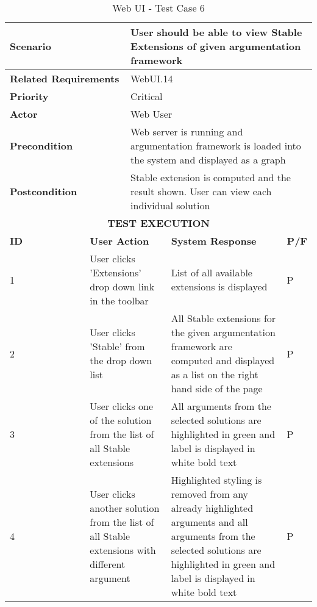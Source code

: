 \begin{longtable}[c]{p{}|p{}|p{}|p{}|p{}}
	\caption{Web UI - Test Case 6}
	\label{table:testcase6} \\
	\hline
	\multicolumn{2}{p{0.3\textwidth}}{\textbf{Scenario}} & \multicolumn{3}{p{0.6\textwidth}}{User should be able to view Stable Extensions of given argumentation framework} \\ 
	\hline
	\endfirsthead
	\endhead
	\multicolumn{2}{p{0.3\textwidth}}{\textbf{Related Requirements}} & \multicolumn{3}{p{0.6\textwidth}}{WebUI.14} \\ 
	\hline
	\multicolumn{2}{p{0.3\textwidth}}{\textbf{Priority}} & \multicolumn{3}{p{0.6\textwidth}}{Critical} \\ 
	\hline
	\multicolumn{2}{p{0.3\textwidth}}{\textbf{Actor}} & \multicolumn{3}{p{0.6\textwidth}}{Web User} \\ 
	\hline
	\multicolumn{2}{p{0.3\textwidth}}{\textbf{Precondition}} & \multicolumn{3}{p{0.6\textwidth}}{Web server is running and argumentation framework is loaded into the system and displayed as a graph} \\ 
	\hline
	\multicolumn{2}{p{0.3\textwidth}}{\textbf{Postcondition}} & \multicolumn{3}{p{0.6\textwidth}}{Stable extension is computed and the result shown. User can view each individual solution} \\ 
	\hline
	\multicolumn{5}{c}{\cellcolor{grey}\textbf{TEST EXECUTION}} \\ 
	\hline
	\textbf{ID} & \multicolumn{2}{|p{0.4\textwidth}|}{\textbf{User Action}} & \textbf{System Response} & \textbf{P/F} \\ 
	\hline
	1 & \multicolumn{2}{|p{0.4\textwidth}|}{User clicks 'Extensions' drop down link in the toolbar} & List of all available extensions is displayed & P \\ 
	\hline
	2 & \multicolumn{2}{|p{0.4\textwidth}|}{User clicks 'Stable' from the drop down list} & All Stable extensions for the given argumentation framework are computed and displayed as a list on the right hand side of the page & P \\ 
	\hline
	3 & \multicolumn{2}{|p{0.4\textwidth}|}{User clicks one of the solution from the list of all Stable extensions} & All arguments from the selected solutions are highlighted in green and label is displayed in white bold text & P \\ 
	\hline
	4 & \multicolumn{2}{|p{0.4\textwidth}|}{User clicks another solution from the list of all Stable extensions with different argument} & Highlighted styling is removed from any already highlighted arguments and all arguments from the selected solutions are highlighted in green and label is displayed in white bold text & P \\ 
	\hline
\end{longtable}

